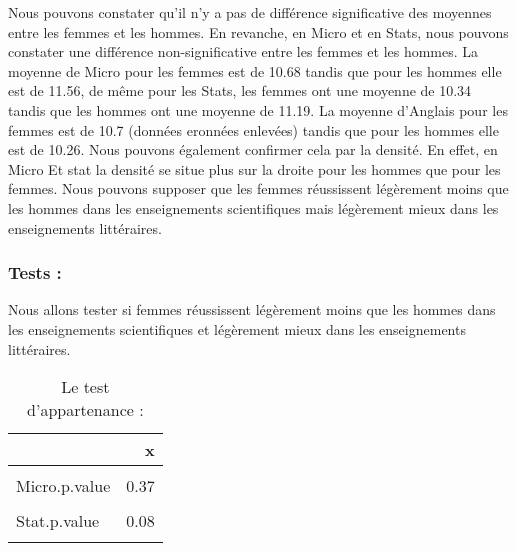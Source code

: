 \documentclass[
  11pt,
  french,
]{article}
\begin{document}
Nous pouvons constater qu'il n'y a pas de différence significative des
moyennes entre les femmes et les hommes. En revanche, en Micro et en
Stats, nous pouvons constater une différence non-significative entre les
femmes et les hommes. La moyenne de Micro pour les femmes est de 10.68
tandis que pour les hommes elle est de 11.56, de même pour les Stats,
les femmes ont une moyenne de 10.34 tandis que les hommes ont une
moyenne de 11.19. La moyenne d'Anglais pour les femmes est de 10.7
(données eronnées enlevées) tandis que pour les hommes elle est de
10.26. Nous pouvons également confirmer cela par la densité. En effet,
en Micro Et stat la densité se situe plus sur la droite pour les hommes
que pour les femmes. Nous pouvons supposer que les femmes réussissent
légèrement moins que les hommes dans les enseignements scientifiques
mais légèrement mieux dans les enseignements littéraires.

\hypertarget{tests-3}{%
\subsubsection{Tests :}\label{tests-3}}

Nous allons tester si femmes réussissent légèrement moins que les hommes
dans les enseignements scientifiques et légèrement mieux dans les
enseignements littéraires.

\begin{table}[!h]

\caption{\label{tab:tests4_non}Le test d'appartenance :}
\centering
\begin{tabular}[t]{lr}
\toprule
  & x\\
\midrule
\cellcolor{gray!6}{Macro.p.value} & \cellcolor{gray!6}{0.74}\\
Micro.p.value & 0.37\\
\cellcolor{gray!6}{Maths.p.value} & \cellcolor{gray!6}{0.02}\\
Stat.p.value & 0.08\\
\cellcolor{gray!6}{Anglais.p.value} & \cellcolor{gray!6}{0.00}\\
\bottomrule
\end{tabular}
\end{table}
\end{document}
